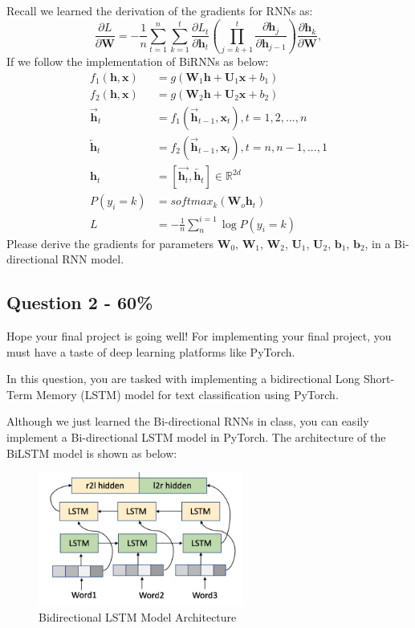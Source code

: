 \documentclass{article}
\begin{document}
Recall we learned the derivation of the gradients for RNNs as:
$$\frac{\partial L }{\partial \mathbf{W}} = -\frac{1}{n}\sum_{t=1}^{n}\sum_{k=1}^{t}  \frac{\partial L_t }{\partial  \mathbf{h}_t}\left ( \prod_{j=k+1}^{t}  \frac{\partial \mathbf{h}_j  }{\partial  \mathbf{h}_{j-1}} \right ) \frac{\partial \mathbf{h}_k }{\partial \mathbf{W}},$$
If we follow the implementation of BiRNNs as below:
\begin{align}
    f_1(\mathbf{h}, \mathbf{x}) &= g(\mathbf{W}_1\mathbf{h} + \mathbf{U}_1\mathbf{x} + b_1)\\
    f_2(\mathbf{h}, \mathbf{x}) &= g(\mathbf{W}_2\mathbf{h} + \mathbf{U}_2\mathbf{x} + b_2)\\
    \overrightarrow{\mathbf{h}}_t &= f_1(\overrightarrow{\mathbf{h}}_{t-1}, \mathbf{x}_t), t=1,2,...,n\\
    \overleftarrow{\mathbf{h}}_t &=  f_2(\overrightarrow{\mathbf{h}}_{t-1}, \mathbf{x}_t), t=n,n-1,...,1\\
    \mathbf{h}_t &= \left [ \overrightarrow{\mathbf{h}_t}, \overleftarrow{\mathbf{h}_t} \right ] \in \mathbb{R}^{2d}\\
    P(y_i=k) &= softmax_k(\mathbf{W}_o \mathbf{h}_t)\\
   L &= -\frac{1}{n}\sum_{n}^{i=1}\log P(y_i=k)  
   \end{align}
Please derive the gradients for parameters $\mathbf{W}_0$, $\mathbf{W}_1$, $\mathbf{W}_2$, $\mathbf{U}_1$, $\mathbf{U}_2$, $\mathbf{b}_1$, $\mathbf{b}_2$, in a Bi-directional RNN model.

\subsection*{Question 2 - 60\%}

Hope your final project is going well!
For implementing your final project,
you must have a taste of deep learning platforms like PyTorch.

In this question, you are tasked with implementing a bidirectional 
Long Short-Term Memory (LSTM) model
for text classification using PyTorch. 

Although we just learned the Bi-directional RNNs in class,
you can easily implement a Bi-directional LSTM model in PyTorch.
The architecture of the BiLSTM model is shown as below:

\begin{figure}[h]
    \centering
    \includegraphics[width=0.6\textwidth]{bi-dir-lstm.png}
    \caption{Bidirectional LSTM Model Architecture}
\end{figure}
\end{document}
